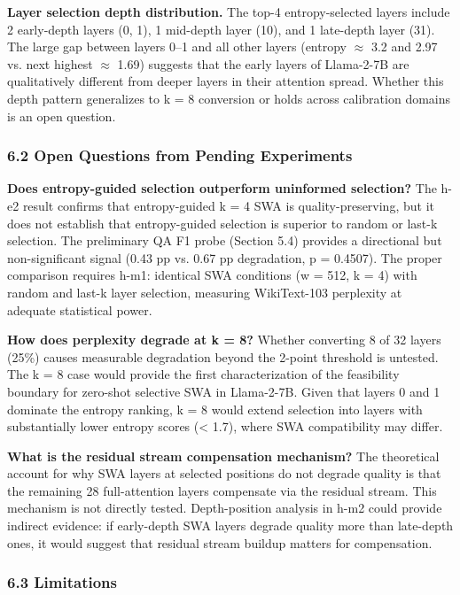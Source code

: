 \textbf{Layer selection depth distribution.} The top-4 entropy-selected layers include 2 early-depth layers (0, 1), 1 mid-depth layer (10), and 1 late-depth layer (31). The large gap between layers 0--1 and all other layers (entropy $\approx$ 3.2 and 2.97 vs. next highest $\approx$ 1.69) suggests that the early layers of Llama-2-7B are qualitatively different from deeper layers in their attention spread. Whether this depth pattern generalizes to k = 8 conversion or holds across calibration domains is an open question.

\subsubsection{6.2 Open Questions from Pending Experiments}

\textbf{Does entropy-guided selection outperform uninformed selection?} The h-e2 result confirms that entropy-guided k = 4 SWA is quality-preserving, but it does not establish that entropy-guided selection is superior to random or last-k selection. The preliminary QA F1 probe (Section 5.4) provides a directional but non-significant signal (0.43 pp vs. 0.67 pp degradation, p = 0.4507). The proper comparison requires h-m1: identical SWA conditions (w = 512, k = 4) with random and last-k layer selection, measuring WikiText-103 perplexity at adequate statistical power.

\textbf{How does perplexity degrade at k = 8?} Whether converting 8 of 32 layers (25\%) causes measurable degradation beyond the 2-point threshold is untested. The k = 8 case would provide the first characterization of the feasibility boundary for zero-shot selective SWA in Llama-2-7B. Given that layers 0 and 1 dominate the entropy ranking, k = 8 would extend selection into layers with substantially lower entropy scores (< 1.7), where SWA compatibility may differ.

\textbf{What is the residual stream compensation mechanism?} The theoretical account for why SWA layers at selected positions do not degrade quality is that the remaining 28 full-attention layers compensate via the residual stream. This mechanism is not directly tested. Depth-position analysis in h-m2 could provide indirect evidence: if early-depth SWA layers degrade quality more than late-depth ones, it would suggest that residual stream buildup matters for compensation.

\subsubsection{6.3 Limitations}

